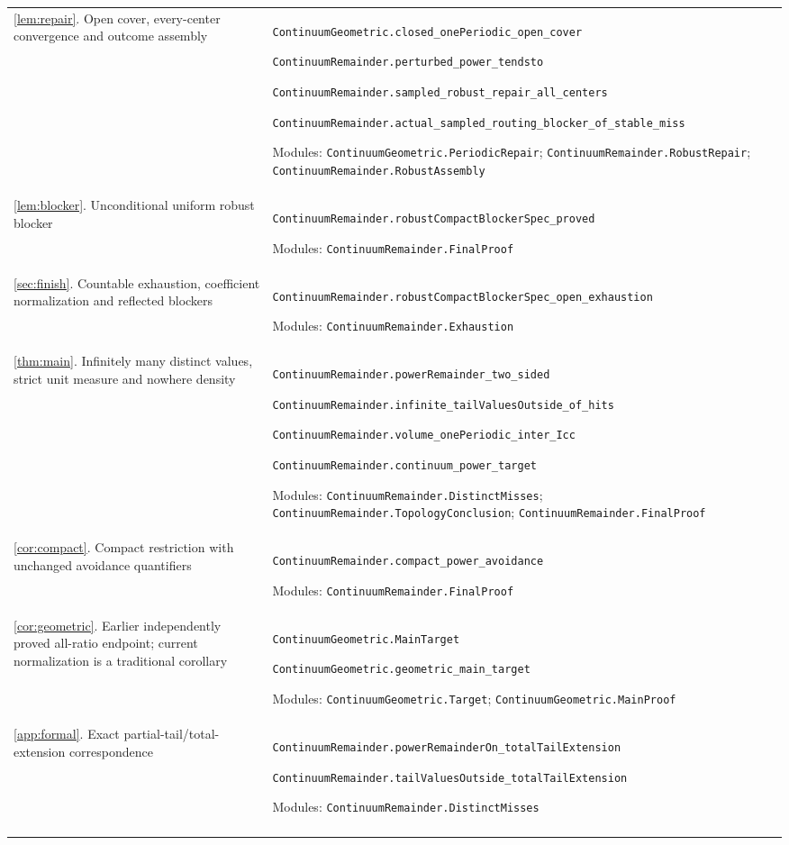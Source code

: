 \begin{longtable}{@{}p{}p{}@{}}
\ref{lem:repair}. Open cover, every-center convergence and outcome assembly & \nolinkurl{ContinuumGeometric.closed_onePeriodic_open_cover}\par \nolinkurl{ContinuumRemainder.perturbed_power_tendsto}\par \nolinkurl{ContinuumRemainder.sampled_robust_repair_all_centers}\par \nolinkurl{ContinuumRemainder.actual_sampled_routing_blocker_of_stable_miss}\par\smallskip Modules: \nolinkurl{ContinuumGeometric.PeriodicRepair}; \nolinkurl{ContinuumRemainder.RobustRepair}; \nolinkurl{ContinuumRemainder.RobustAssembly} \\\addlinespace
\ref{lem:blocker}. Unconditional uniform robust blocker & \nolinkurl{ContinuumRemainder.robustCompactBlockerSpec_proved}\par\smallskip Modules: \nolinkurl{ContinuumRemainder.FinalProof} \\\addlinespace
\ref{sec:finish}. Countable exhaustion, coefficient normalization and reflected blockers & \nolinkurl{ContinuumRemainder.robustCompactBlockerSpec_open_exhaustion}\par\smallskip Modules: \nolinkurl{ContinuumRemainder.Exhaustion} \\\addlinespace
\ref{thm:main}. Infinitely many distinct values, strict unit measure and nowhere density & \nolinkurl{ContinuumRemainder.powerRemainder_two_sided}\par \nolinkurl{ContinuumRemainder.infinite_tailValuesOutside_of_hits}\par \nolinkurl{ContinuumRemainder.volume_onePeriodic_inter_Icc}\par \nolinkurl{ContinuumRemainder.continuum_power_target}\par\smallskip Modules: \nolinkurl{ContinuumRemainder.DistinctMisses}; \nolinkurl{ContinuumRemainder.TopologyConclusion}; \nolinkurl{ContinuumRemainder.FinalProof} \\\addlinespace
\ref{cor:compact}. Compact restriction with unchanged avoidance quantifiers & \nolinkurl{ContinuumRemainder.compact_power_avoidance}\par\smallskip Modules: \nolinkurl{ContinuumRemainder.FinalProof} \\\addlinespace
\ref{cor:geometric}. Earlier independently proved all-ratio endpoint; current normalization is a traditional corollary & \nolinkurl{ContinuumGeometric.MainTarget}\par \nolinkurl{ContinuumGeometric.geometric_main_target}\par\smallskip Modules: \nolinkurl{ContinuumGeometric.Target}; \nolinkurl{ContinuumGeometric.MainProof} \\\addlinespace
\ref{app:formal}. Exact partial-tail/total-extension correspondence & \nolinkurl{ContinuumRemainder.powerRemainderOn_totalTailExtension}\par \nolinkurl{ContinuumRemainder.tailValuesOutside_totalTailExtension}\par\smallskip Modules: \nolinkurl{ContinuumRemainder.DistinctMisses} \\\addlinespace
\end{longtable}
\normalsize
